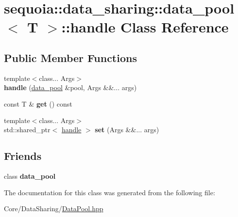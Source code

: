 \hypertarget{classsequoia_1_1data__sharing_1_1data__pool_1_1handle}{}\section{sequoia\+::data\+\_\+sharing\+::data\+\_\+pool$<$ T $>$\+::handle Class Reference}
\label{classsequoia_1_1data__sharing_1_1data__pool_1_1handle}
\subsection*{Public Member Functions}
\begin{DoxyCompactItemize}
\item 
\mbox{\label{classsequoia_1_1data__sharing_1_1data__pool_1_1handle_a477169b756ad12efb0ba22deb334b6e7}} 
{\footnotesize template$<$class... Args$>$ }\\{\bfseries handle} (\mbox{\hyperlink{classsequoia_1_1data__sharing_1_1data__pool}{data\+\_\+pool}} \&pool, Args \&\&... args)
\item 
\mbox{\label{classsequoia_1_1data__sharing_1_1data__pool_1_1handle_a917a3f47a9bf362ed224a3b40c5f951a}} 
const T \& {\bfseries get} () const
\item 
\mbox{\label{classsequoia_1_1data__sharing_1_1data__pool_1_1handle_a73154e9de9f07eb06ab8769275e4ebf6}} 
{\footnotesize template$<$class... Args$>$ }\\std\+::shared\+\_\+ptr$<$ \mbox{\hyperlink{classsequoia_1_1data__sharing_1_1data__pool_1_1handle}{handle}} $>$ {\bfseries set} (Args \&\&... args)
\end{DoxyCompactItemize}
\subsection*{Friends}
\begin{DoxyCompactItemize}
\item 
\mbox{\label{classsequoia_1_1data__sharing_1_1data__pool_1_1handle_a81e5e06621ba2384887be5333a1dae91}} 
class {\bfseries data\+\_\+pool}
\end{DoxyCompactItemize}


The documentation for this class was generated from the following file\+:\begin{DoxyCompactItemize}
\item 
Core/\+Data\+Sharing/\mbox{\hyperlink{_data_pool_8hpp}{Data\+Pool.\+hpp}}\end{DoxyCompactItemize}
